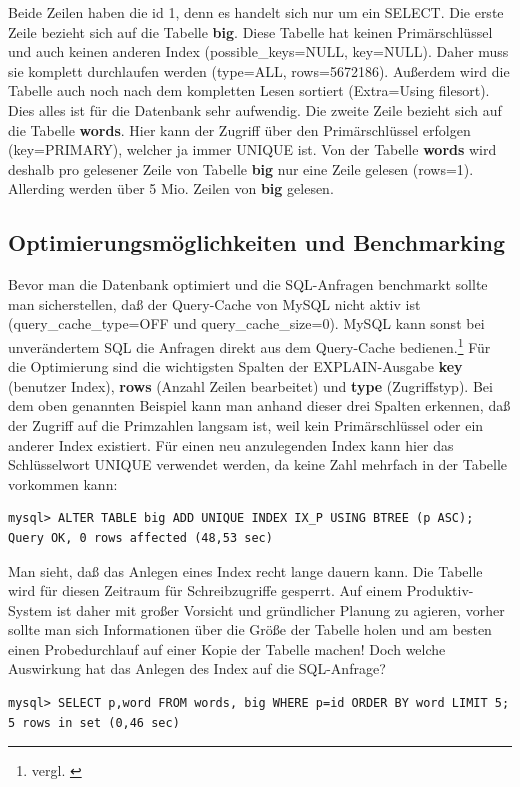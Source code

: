 Beide Zeilen haben die id 1, denn es handelt sich nur um ein SELECT. Die erste Zeile bezieht sich auf die Tabelle \textbf{big}. Diese Tabelle hat keinen Primärschlüssel und auch keinen anderen Index (possible\_keys=NULL, key=NULL). Daher muss sie komplett durchlaufen werden (type=ALL, rows=5672186). Außerdem wird die Tabelle auch noch nach dem kompletten Lesen sortiert (Extra=Using filesort). Dies alles ist für die Datenbank sehr aufwendig. Die zweite Zeile bezieht sich auf die Tabelle \textbf{words}. Hier kann der Zugriff über den Primärschlüssel erfolgen (key=PRIMARY), welcher ja immer UNIQUE ist. Von der Tabelle \textbf{words} wird deshalb pro gelesener Zeile von Tabelle \textbf{big} nur eine Zeile gelesen (rows=1). Allerding werden über 5 Mio. Zeilen von \textbf{big} gelesen.
\subsection{Optimierungsmöglichkeiten und Benchmarking}
Bevor man die Datenbank optimiert und die SQL-Anfragen benchmarkt sollte man sicherstellen,
daß der Query-Cache von MySQL nicht aktiv ist (query\_cache\_type=OFF und query\_cache\_size=0). MySQL kann sonst bei unverändertem SQL die Anfragen direkt aus dem Query-Cache bedienen.\footnote{vergl. \cite{Kraze2011}} Für die Optimierung sind die wichtigsten Spalten der EXPLAIN-Ausgabe \textbf{key} (benutzer Index), \textbf{rows} (Anzahl Zeilen bearbeitet) und \textbf{type} (Zugriffstyp).
Bei dem oben genannten Beispiel kann man anhand dieser drei Spalten erkennen, daß der Zugriff auf die Primzahlen langsam ist, weil kein Primärschlüssel oder ein anderer Index existiert.
Für einen neu anzulegenden Index kann hier das Schlüsselwort UNIQUE verwendet werden, da keine Zahl mehrfach in der Tabelle vorkommen kann:
\begin{lstlisting}[caption=1. Optimierung: Anlegen eines Index für die Primzahlen]
mysql> ALTER TABLE big ADD UNIQUE INDEX IX_P USING BTREE (p ASC);
Query OK, 0 rows affected (48,53 sec)
\end{lstlisting}
Man sieht, daß das Anlegen eines Index recht lange dauern kann. Die Tabelle wird für diesen Zeitraum für Schreibzugriffe gesperrt. Auf einem Produktiv-System ist daher mit großer Vorsicht und gründlicher Planung zu agieren, vorher sollte man sich Informationen über die Größe der Tabelle holen und am besten einen Probedurchlauf auf einer Kopie der Tabelle machen!
Doch welche Auswirkung hat das Anlegen des Index auf die SQL-Anfrage?
\begin{lstlisting}[caption=Abfrage nach 1. Optimierung]
mysql> SELECT p,word FROM words, big WHERE p=id ORDER BY word LIMIT 5;
5 rows in set (0,46 sec)
\end{lstlisting}
